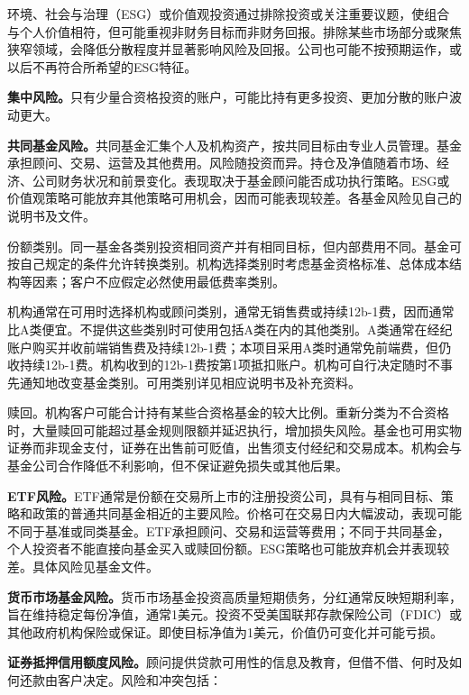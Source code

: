 \documentclass[UTF8,fontset=none,11pt,a4paper]{ctexart}
\begin{document}
环境、社会与治理（ESG）或价值观投资通过排除投资或关注重要议题，使组合与个人价值相符，但可能重视非财务目标而非财务回报。排除某些市场部分或聚焦狭窄领域，会降低分散程度并显著影响风险及回报。公司也可能不按预期运作，或以后不再符合所希望的ESG特征。


\textbf{集中风险。}只有少量合资格投资的账户，可能比持有更多投资、更加分散的账户\allowbreak\mbox{波动更大。}


\textbf{共同基金风险。}共同基金汇集个人及机构资产，按共同目标由专业人员管理。基金承担顾问、交易、运营及其他费用。风险随投资而异。持仓及净值随着市场、经济、公司财务状况和前景变化。表现取决于基金顾问能否成功执行策略。ESG或价值观策略可能放弃其他策略可用机会，因而可能表现较差。各基金风险见自己的说明\allowbreak\mbox{书及文件。}


份额类别。同一基金各类别投资相同资产并有相同目标，但内部费用不同。基金可按自己规定的条件允许转换类别。机构选择类别时考虑基金资格标准、总体成本结构等因素；客户不应假定必然使用最低\allowbreak\mbox{费率类别。}


机构通常在可用时选择机构或顾问类别，通常无销售费或持续12b-1费，因而通常比A类便宜。不提供这些类别时可使用包括A类在内的其他类别。A类通常在经纪账户购买并收前端销售费及持续12b-1费；本项目采用A类时通常免前端费，但仍收持续12b-1费。机构收到的12b-1费按第1项抵扣账户。机构可自行决定随时不事先通知地改变基金类别。可用类别详见相应说明书及\allowbreak\mbox{补充资料。}


赎回。机构客户可能合计持有某些合资格基金的较大比例。重新分类为不合资格时，大量赎回可能超过基金规则限额并延迟执行，增加损失风险。基金也可用实物证券而非现金支付，证券在出售前可贬值，出售须支付经纪和交易成本。机构会与基金公司合作降低不利影响，但不保证避免损失或\allowbreak\mbox{其他后果。}


\textbf{ETF风险。}ETF通常是份额在交易所上市的注册投资公司，具有与相同目标、策略和政策的普通共同基金相近的主要风险。价格可在交易日内大幅波动，表现可能不同于基准或同类基金。ETF承担顾问、交易和运营等费用；不同于共同基金，个人投资者不能直接向基金买入或赎回份额。ESG策略也可能放弃机会并表现较差。具体风险见\allowbreak\mbox{基金文件。}


\textbf{货币市场基金风险。}货币市场基金投资高质量短期债务，分红通常反映短期利率，旨在维持稳定每份净值，通常1美元。投资不受美国联邦存款保险公司（FDIC）或其他政府机构保险或保证。即使目标净值为1美元，价值仍可变化并可\allowbreak\mbox{能亏损。}


\textbf{证券抵押信用额度风险。}顾问提供贷款可用性的信息及教育，但借不借、何时及如何还款由客户决定。风险和\allowbreak\mbox{冲突包括：}
\end{document}
